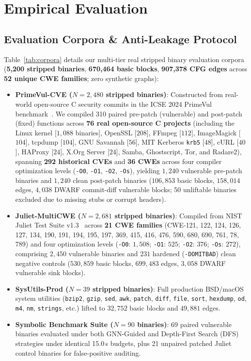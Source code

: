 \documentclass[10pt,conference]{IEEEtran}
\begin{document}
\section{Empirical Evaluation}
\label{sec:eval}

\subsection{Evaluation Corpora \& Anti-Leakage Protocol}
Table~\ref{tab:corpora} details our multi-tier real stripped binary evaluation corpora (\textbf{5{,}200 stripped binaries},
\textbf{670{,}464 basic blocks}, \textbf{907{,}378 CFG edges} across \textbf{52 unique CWE families}; zero synthetic graphs):
\begin{itemize}
  \item \textbf{PrimeVul-CVE ($N = 2{,}480$ stripped binaries)}: Constructed from real-world open-source C security commits in the ICSE 2024 PrimeVul benchmark~\cite{ding2024primevul}. We compiled 310 paired pre-patch (vulnerable) and post-patch (fixed) functions across \textbf{76 real open-source C projects} (including the Linux kernel [$1{,}088$ binaries], OpenSSL [$208$], FFmpeg [$112$], ImageMagick [$104$], tcpdump [$104$], GNU Savannah [$56$], MIT Kerberos \texttt{krb5} [$48$], cURL [$40$], HAProxy [$24$], X.Org Server [$24$], Samba, Ghostscript, Tor, and Radare2), spanning \textbf{292 historical CVEs} and \textbf{36 CWEs} across four compiler optimization levels (\texttt{-O0}, \texttt{-O1}, \texttt{-O2}, \texttt{-Os}), yielding $1{,}240$ vulnerable pre-patch binaries and $1{,}240$ clean post-patch binaries ($106{,}853$ basic blocks, $158{,}014$ edges, $4{,}038$ DWARF commit-diff vulnerable blocks; 50 unliftable binaries excluded due to missing stubs or corrupt headers).
  \item \textbf{Juliet-MultiCWE ($N = 2{,}681$ stripped binaries)}: Compiled from NIST Juliet Test Suite v1.3~\cite{juliet2010} across \textbf{21 CWE families} (CWE-121, 122, 124, 126, 127, 134, 190, 191, 194, 195, 197, 369, 415, 416, 476, 590, 680, 690, 761, 78, 789) and four optimization levels (\texttt{-O0}: $1{,}508$; \texttt{-O1}: $525$; \texttt{-O2}: $376$; \texttt{-Os}: $272$), comprising $2{,}450$ vulnerable binaries and $231$ hardened (\texttt{-DOMITBAD}) clean negative controls ($530{,}859$ basic blocks, $699{,}483$ edges, $3{,}058$ DWARF vulnerable sink blocks).
  \item \textbf{SysUtils-Prod ($N = 39$ stripped binaries)}: Full production BSD/macOS system utilities (\texttt{bzip2}, \texttt{gzip}, \texttt{sed}, \texttt{awk}, \texttt{patch}, \texttt{diff}, \texttt{file}, \texttt{sort}, \texttt{hexdump}, \texttt{od}, \texttt{m4}, \texttt{nm}, \texttt{strings}, etc.) lifted to $32{,}752$ basic blocks and $49{,}881$ edges.
  \item \textbf{Symbolic Benchmark Suite ($N = 90$ binaries)}: 69 paired vulnerable binaries evaluated under both GNN-Guided and Depth-First Search (DFS) strategies under identical 15.0\,s budgets, plus 21 unpaired patched Juliet control binaries for false-positive auditing.
\end{itemize}
\end{document}
